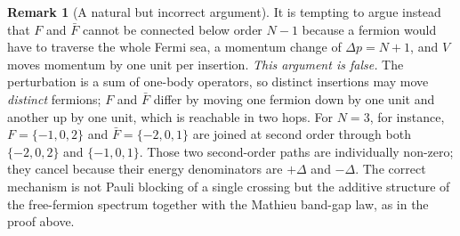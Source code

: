 \documentclass[11pt,a4paper]{article}
\theoremstyle{definition}
\newtheorem{remark}[theorem]{Remark}
\begin{document}
\begin{remark}[A natural but incorrect argument]\label{rem:pauli_fallacy}
It is tempting to argue instead that $F$ and $\bar F$ cannot be connected below order $N-1$ because a fermion would have to traverse the whole Fermi sea, a momentum change of $\Delta p = N+1$, and $V$ moves momentum by one unit per insertion. \emph{This argument is false.} The perturbation is a sum of one-body operators, so distinct insertions may move \emph{distinct} fermions; $F$ and $\bar F$ differ by moving one fermion down by one unit and another up by one unit, which is reachable in two hops. For $N=3$, for instance, $F = \{-1,0,2\}$ and $\bar F = \{-2,0,1\}$ are joined at second order through both $\{-2,0,2\}$ and $\{-1,0,1\}$. Those two second-order paths are individually non-zero; they cancel because their energy denominators are $+\Delta$ and $-\Delta$. The correct mechanism is not Pauli blocking of a single crossing but the additive structure of the free-fermion spectrum together with the Mathieu band-gap law, as in the proof above.
\end{remark}
\end{document}
